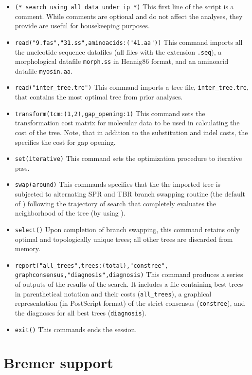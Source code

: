 \begin{itemize}
\item \texttt{(* search using all data under ip *)} This first line of the script is a comment. While comments are optional and do not affect the analyses, they provide are useful for housekeeping purposes.
\item \texttt{read("9.fas","31.ss",aminoacids:("41.aa"))} This command imports all the nucleotide sequence datafiles (all files with the extension \texttt{.seq}), a morphological datafile \texttt{morph.ss} in Hennig86 format, and an aminoacid datafile \texttt{myosin.aa}.
\item \texttt{read("inter\_tree.tre")} This command imports a tree file, \texttt{inter\_tree.tre}, that contains the most optimal tree from prior analyses. 
\item \texttt{transform(tcm:(1,2),gap\_opening:1)} This command sets the transformation cost matrix for molecular data to be used in calculating the cost of the tree. Note, that in addition to the substitution and indel costs, the  specifies the cost for gap opening.
\item \texttt{set(iterative)} This command sets the optimization procedure to iterative pass.
\item \texttt{swap(around)} This commands specifies that the the imported tree is subjected to alternating SPR and TBR branch swapping routine (the default of \poy) following the trajectory of search that completely evaluates the neighborhood of the tree (by using ).
\item \texttt{select()} Upon completion of branch swapping, this command retains only optimal and topologically unique trees; all other trees are discarded from memory.
\item \texttt{report("all\_trees",trees:(total),"constree",\\graphconsensus,"diagnosis",diagnosis)} This command produces a series of outputs of the results of the search. It includes a file containing best trees in parenthetical notation and their costs (\texttt{all\_trees}), a graphical representation (in PostScript format) of the strict consensus (\texttt{constree}), and the diagnoses for all best trees (\texttt{diagnosis}).
\item \texttt{exit()} This commands ends the \poy session.
\end{itemize}

\section{Bremer support}{\label{tutorial 3}}

